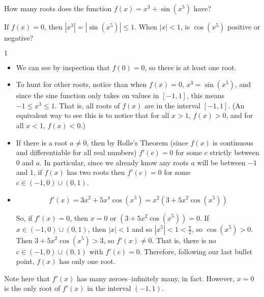 \begin{question}
How many roots does the function $f(x)=x^3+\sin\left(x^5\right)$ have?
\end{question}
\begin{hint}
If $f(x)=0$, then $|x^3|=\left|\sin\left(x^5\right)\right| \leq 1$. When $|x|<1$, is $\cos(x^5)$ positive or negative?
\end{hint}
\begin{answer}
$1$
\end{answer}
\begin{solution}
\begin{itemize}
\item We can see by inspection that $f(0)=0$, so there is at least one root.

\item To hunt for other roots, notice than when $f(x)=0$, $x^3=\sin\left(x^5\right)$, and since the sine function only takes on values in $[-1,1]$, this means $-1 \leq x^3 \leq 1$. That is, all roots of $f(x)$ are in the interval $[-1,1]$. (An equivalent way to see this is to notice that for all $x >1$, $f(x)>0$, and for all $x<1$, $f(x)<0$.)

\item If there is a root $a \neq 0$, then by Rolle's Theorem (since $f(x)$ is continuous and differentiable for all real numbers) $f'(c)=0$ for some $c$ strictly between 0 and $a$. In particular, since we already know any roots $a$ will be between $-1$ and $1$, if $f(x)$ has two roots then $f'(c)=0$ for some $c \in (-1,0) \cup (0,1)$.

\item
\[f'(x)=3x^2+5x^4\cos\left(x^5\right)=x^2\left(3+5x^2\cos\left(x^5\right)\right)\]

So, if $f'(x)=0$, then $x=0$ or $\left(3+5x^2\cos\left(x^5\right)\right)=0$. If $x \in (-1,0) \cup (0,1)$, then $|x|<1$ and so $|x^5|<1<\frac{\pi}{2}$, so $\cos\left(x^5\right)>0$. Then $3+5x^2\cos\left(x^5\right) > 3$, so $f'(x) \neq 0$. That is, there is no $c \in (-1,0) \cup (0,1)$ with $f'(c)=0$. Therefore, following our last  bullet point, $f(x)$ has only one root.
\end{itemize}
Note here that $f'(x)$ has many zeroes--infinitely many, in fact. However, $x=0$ is the only root of $f'(x)$ in the interval $(-1,1)$.
\end{solution}


